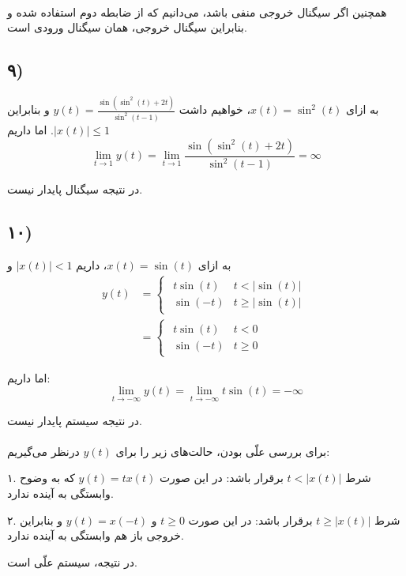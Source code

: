 \documentclass{article}
\begin{document}
	\paragraph*{}
	همچنین اگر سیگنال خروجی منفی باشد، می‌دانیم که از ضابطه دوم استفاده شده و بنابراین سیگنال خروجی، همان سیگنال ورودی است.

	\subsection*{۹)}
	به ازای
	$x(t) = \sin^2(t)$،
	خواهیم داشت
	$y(t) = \frac{\sin(\sin^2(t) + 2t)}{\sin^2(t-1)}$
	و بنابراین
	$ |x(t)| \le 1$.
	اما داریم
	\begin{equation*}
		\lim_{t \rightarrow 1} y(t) = \lim_{t \rightarrow 1} \frac{\sin(\sin^2(t) + 2t)}{\sin^2(t-1)} = \infty
	\end{equation*}

	در نتیجه سیگنال پایدار نیست.

	\subsection*{۱۰)}
	به ازای
	$x(t) = \sin(t)$،
	داریم
	$|x(t)| < 1 $
	و
	\begin{align*}
		y(t) &=
		\begin{cases}
			\begin{matrix}
				t\sin(t) & t < |\sin(t)| \\
				\sin(-t) & t \ge |\sin(t)|
			\end{matrix}
		\end{cases} \\
		&=
		\begin{cases}
			\begin{matrix}
				t\sin(t) & t < 0 \\
				\sin(-t) & t \ge 0
			\end{matrix}
		\end{cases}
	\end{align*}

	اما داریم:
	\begin{equation*}
		\lim_{t \rightarrow -\infty} y(t) = \lim_{t \rightarrow -\infty} t\sin(t)
		= -\infty
	\end{equation*}

	در نتیجه سیستم پایدار نیست.

	\paragraph*{}
	برای بررسی علّی بودن، حالت‌های زیر را برای
	$y(t)$
	درنظر می‌گیریم:

	۱. شرط
	$t < |x(t)|$
	برقرار باشد: در این صورت
	$y(t) = tx(t)$
	که به وضوح وابستگی به آینده ندارد.

	۲. شرط
	$t \ge |x(t)|$
	برقرار باشد: در این صورت
	$t \ge 0$
	و
	$y(t) = x(-t)$
	و بنابراین خروجی باز هم وابستگی به آینده ندارد.

	در نتیجه، سیستم علّی است.
\end{document}
